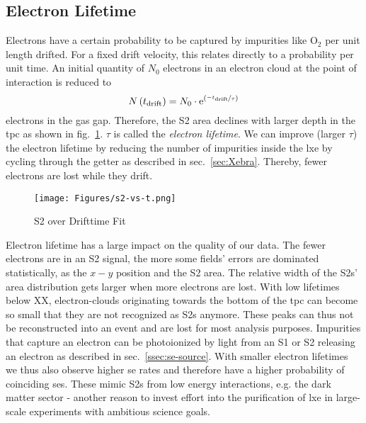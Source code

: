 
\FloatBarrier
\subsection{Electron Lifetime}
\label{ssec:e-lifetime}
\FloatBarrier


Electrons have a certain probability to be captured by impurities like $ \mathrm{O}_2 $ per unit length drifted.
For a fixed drift velocity, this relates directly to a probability per unit time.
An initial quantity of $ N_0 $ electrons in an electron cloud at the point of interaction is reduced to
\begin{equation}
    N \left( t_\mathrm{drift} \right) = N_0 \cdot \mathrm{e}^{ \left( \nicefrac{-t_\mathrm{drift}}{\tau} \right)}
    \label{eq:e-lifetime}
\end{equation}
electrons in the gas gap.
Therefore, the S2 area declines with larger depth in the \gls{tpc} as shown in fig.~\ref{fig:s2-vs-t}.
$ \tau $ is called the \emph{electron lifetime}.
We can improve (larger $ \tau $) the electron lifetime by reducing the number of impurities inside the \gls{lxe} by cycling through the getter as described in sec.~\ref{sec:Xebra}. %
Thereby, fewer electrons are lost while they drift.


\begin{figure}
    \centering
    \texttt{[image: Figures/s2-vs-t.png]}  %
    \caption[S2 over Drifttime Fit]{
        S2 over Drifttime Fit
    }
    \label{fig:s2-vs-t}
\end{figure}


Electron lifetime has a large impact on the quality of our data.
The fewer electrons are in an S2 signal, the more some fields' errors are dominated statistically, as the $ x-y$ position and the S2 area.
The relative width of the S2s' area distribution gets larger when more electrons are lost.
With low lifetimes below XX, electron-clouds originating towards the bottom of the \gls{tpc} can become so small that they are not recognized as S2s anymore.  %
These peaks can thus not be reconstructed into an event and are lost for most analysis purposes.
Impurities that capture an electron can be photoionized by light from an S1 or S2 releasing an electron as described in sec.~\ref{ssec:se-source}.  %
With smaller electron lifetimes we thus also observe higher \gls{se} rates and therefore have a higher probability of coinciding \glspl{se}.
These mimic S2s from low energy interactions, e.g. the dark matter sector - another reason to invest effort into the purification of \gls{lxe} in large-scale experiments with ambitious science goals.

